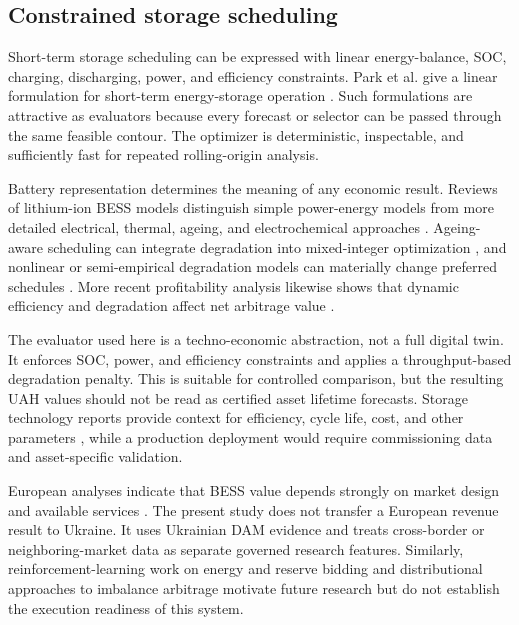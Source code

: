 \subsection{Constrained storage scheduling}

Short-term storage scheduling can be expressed with linear energy-balance, SOC, charging, discharging, power, and efficiency constraints. Park et al. give a linear formulation for short-term energy-storage operation \cite{park2017esslp}. Such formulations are attractive as evaluators because every forecast or selector can be passed through the same feasible contour. The optimizer is deterministic, inspectable, and sufficiently fast for repeated rolling-origin analysis.

Battery representation determines the meaning of any economic result. Reviews of lithium-ion BESS models distinguish simple power-energy models from more detailed electrical, thermal, ageing, and electrochemical approaches \cite{vykhodtsev2022review}. Ageing-aware scheduling can integrate degradation into mixed-integer optimization \cite{hesse2019ageing}, and nonlinear or semi-empirical degradation models can materially change preferred schedules \cite{maheshwari2020degradation,kumtepeli2020arbitrage}. More recent profitability analysis likewise shows that dynamic efficiency and degradation affect net arbitrage value \cite{grimaldi2024profitability}.

The evaluator used here is a techno-economic abstraction, not a full digital twin. It enforces SOC, power, and efficiency constraints and applies a throughput-based degradation penalty. This is suitable for controlled comparison, but the resulting UAH values should not be read as certified asset lifetime forecasts. Storage technology reports provide context for efficiency, cycle life, cost, and other parameters \cite{augustine2021storage}, while a production deployment would require commissioning data and asset-specific validation.

European analyses indicate that BESS value depends strongly on market design and available services \cite{hu2022europeanbess}. The present study does not transfer a European revenue result to Ukraine. It uses Ukrainian DAM evidence and treats cross-border or neighboring-market data as separate governed research features. Similarly, reinforcement-learning work on energy and reserve bidding \cite{li2024temporalrl} and distributional approaches to imbalance arbitrage \cite{madahi2023distributional} motivate future research but do not establish the execution readiness of this system.

